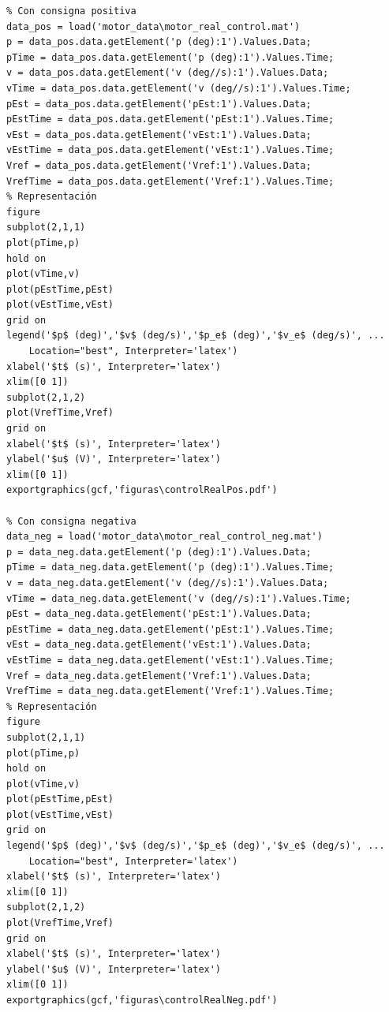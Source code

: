 \documentclass{article}
\begin{document}
\begin{verbatim}
% Con consigna positiva
data_pos = load('motor_data\motor_real_control.mat')
p = data_pos.data.getElement('p (deg):1').Values.Data;
pTime = data_pos.data.getElement('p (deg):1').Values.Time;
v = data_pos.data.getElement('v (deg//s):1').Values.Data;
vTime = data_pos.data.getElement('v (deg//s):1').Values.Time;
pEst = data_pos.data.getElement('pEst:1').Values.Data;
pEstTime = data_pos.data.getElement('pEst:1').Values.Time;
vEst = data_pos.data.getElement('vEst:1').Values.Data;
vEstTime = data_pos.data.getElement('vEst:1').Values.Time;
Vref = data_pos.data.getElement('Vref:1').Values.Data;
VrefTime = data_pos.data.getElement('Vref:1').Values.Time;
% Representación
figure
subplot(2,1,1)
plot(pTime,p)
hold on
plot(vTime,v)
plot(pEstTime,pEst)
plot(vEstTime,vEst)
grid on
legend('$p$ (deg)','$v$ (deg/s)','$p_e$ (deg)','$v_e$ (deg/s)', ...
    Location="best", Interpreter='latex')
xlabel('$t$ (s)', Interpreter='latex')
xlim([0 1])
subplot(2,1,2)
plot(VrefTime,Vref)
grid on
xlabel('$t$ (s)', Interpreter='latex')
ylabel('$u$ (V)', Interpreter='latex')
xlim([0 1])
exportgraphics(gcf,'figuras\controlRealPos.pdf')

% Con consigna negativa
data_neg = load('motor_data\motor_real_control_neg.mat')
p = data_neg.data.getElement('p (deg):1').Values.Data;
pTime = data_neg.data.getElement('p (deg):1').Values.Time;
v = data_neg.data.getElement('v (deg//s):1').Values.Data;
vTime = data_neg.data.getElement('v (deg//s):1').Values.Time;
pEst = data_neg.data.getElement('pEst:1').Values.Data;
pEstTime = data_neg.data.getElement('pEst:1').Values.Time;
vEst = data_neg.data.getElement('vEst:1').Values.Data;
vEstTime = data_neg.data.getElement('vEst:1').Values.Time;
Vref = data_neg.data.getElement('Vref:1').Values.Data;
VrefTime = data_neg.data.getElement('Vref:1').Values.Time;
% Representación
figure
subplot(2,1,1)
plot(pTime,p)
hold on
plot(vTime,v)
plot(pEstTime,pEst)
plot(vEstTime,vEst)
grid on
legend('$p$ (deg)','$v$ (deg/s)','$p_e$ (deg)','$v_e$ (deg/s)', ...
    Location="best", Interpreter='latex')
xlabel('$t$ (s)', Interpreter='latex')
xlim([0 1])
subplot(2,1,2)
plot(VrefTime,Vref)
grid on
xlabel('$t$ (s)', Interpreter='latex')
ylabel('$u$ (V)', Interpreter='latex')
xlim([0 1])
exportgraphics(gcf,'figuras\controlRealNeg.pdf')
\end{verbatim}


\end{document}
